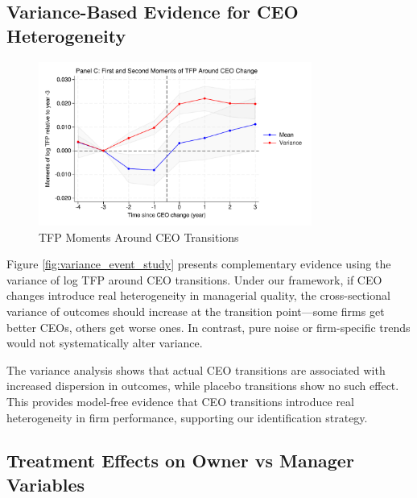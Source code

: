 \documentclass[11pt,a4paper]{article}
\begin{document}

\subsection{Variance-Based Evidence for CEO Heterogeneity}

\begin{figure}[htbp]
\centering
\includegraphics[width=0.8\textwidth]{figure/event_study_panel_c.pdf}
\caption{TFP Moments Around CEO Transitions}
\label{fig:intangibles}
\end{figure}

Figure \ref{fig:variance_event_study} presents complementary evidence using the variance of log TFP around CEO transitions. Under our framework, if CEO changes introduce real heterogeneity in managerial quality, the cross-sectional variance of outcomes should increase at the transition point—some firms get better CEOs, others get worse ones. In contrast, pure noise or firm-specific trends would not systematically alter variance.

The variance analysis shows that actual CEO transitions are associated with increased dispersion in outcomes, while placebo transitions show no such effect. This provides model-free evidence that CEO transitions introduce real heterogeneity in firm performance, supporting our identification strategy.


\subsection{Treatment Effects on Owner vs Manager Variables}




\end{document}
